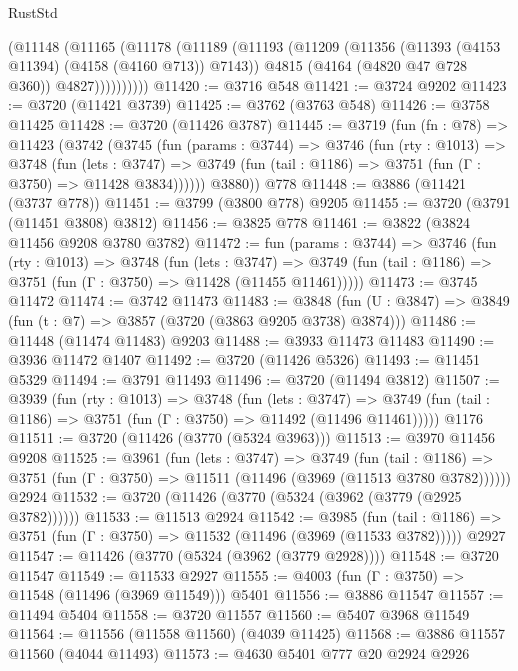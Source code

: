 \begin{lexlean}{RustStd}
\begin{coremodule}
            (@11148
              (@11165
                (@11178
                  (@11189
                    (@11193
                      (@11209
                        (@11356 (@11393 (@4153 @11394) (@4158 (@4160 @713)) @7143))
                        @4815
                        (@4164 (@4820 @47 @728 @360))
                        @4827))))))))))
@11420 := @3716 @548
@11421 := @3724 @9202
@11423 := @3720 (@11421 @3739)
@11425 := @3762 (@3763 @548)
@11426 := @3758 @11425
@11428 := @3720 (@11426 @3787)
@11445 := @3719
    (fun (fn : @78) =>
    @11423
      (@3742
        (@3745
          (fun (params : @3744) =>
          @3746
            (fun (rty : @1013) =>
            @3748
              (fun (lets : @3747) =>
              @3749 (fun (tail : @1186) => @3751 (fun (Γ : @3750) => @11428 @3834))))))
        @3880))
    @778
@11448 := @3886 (@11421 (@3737 @778))
@11451 := @3799 (@3800 @778) @9205
@11455 := @3720 (@3791 (@11451 @3808) @3812)
@11456 := @3825 @778
@11461 := @3822 (@3824 @11456 @9208 @3780 @3782)
@11472 := fun (params : @3744) =>
  @3746
    (fun (rty : @1013) =>
    @3748
      (fun (lets : @3747) =>
      @3749 (fun (tail : @1186) => @3751 (fun (Γ : @3750) => @11428 (@11455 @11461)))))
@11473 := @3745 @11472
@11474 := @3742 @11473
@11483 := @3848 (fun (U : @3847) => @3849 (fun (t : @7) => @3857 (@3720 (@3863 @9205 @3738) @3874)))
@11486 := @11448 (@11474 @11483) @9203
@11488 := @3933 @11473 @11483
@11490 := @3936 @11472 @1407
@11492 := @3720 (@11426 @5326)
@11493 := @11451 @5329
@11494 := @3791 @11493
@11496 := @3720 (@11494 @3812)
@11507 := @3939
    (fun (rty : @1013) =>
    @3748
      (fun (lets : @3747) =>
      @3749 (fun (tail : @1186) => @3751 (fun (Γ : @3750) => @11492 (@11496 @11461)))))
    @1176
@11511 := @3720 (@11426 (@3770 (@5324 @3963)))
@11513 := @3970 @11456 @9208
@11525 := @3961
    (fun (lets : @3747) =>
    @3749
      (fun (tail : @1186) =>
      @3751 (fun (Γ : @3750) => @11511 (@11496 (@3969 (@11513 @3780 @3782))))))
    @2924
@11532 := @3720 (@11426 (@3770 (@5324 (@3962 (@3779 (@2925 @3782))))))
@11533 := @11513 @2924
@11542 := @3985
    (fun (tail : @1186) => @3751 (fun (Γ : @3750) => @11532 (@11496 (@3969 (@11533 @3782)))))
    @2927
@11547 := @11426 (@3770 (@5324 (@3962 (@3779 @2928))))
@11548 := @3720 @11547
@11549 := @11533 @2927
@11555 := @4003 (fun (Γ : @3750) => @11548 (@11496 (@3969 @11549))) @5401
@11556 := @3886 @11547
@11557 := @11494 @5404
@11558 := @3720 @11557
@11560 := @5407 @3968 @11549
@11564 := @11556 (@11558 @11560) (@4039 @11425)
@11568 := @3886 @11557 @11560 (@4044 @11493)
@11573 := @4630 @5401 @777 @20 @2924 @2926

\end{coremodule}
\end{lexlean}
